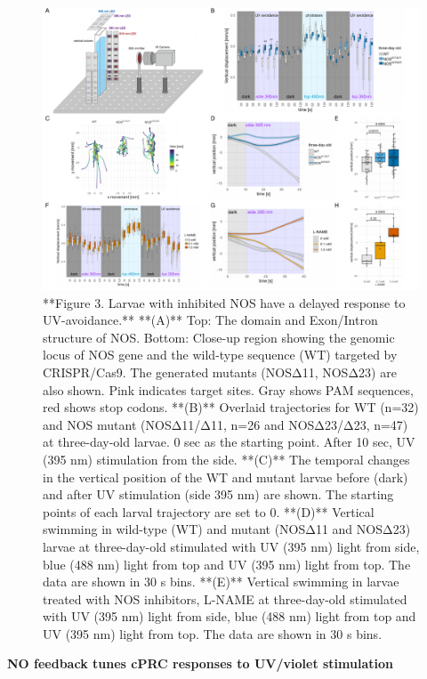 \documentclass[
  10pt,
  onecolumn]{article}
\begin{document}
\begin{figure}
\includegraphics[width=33.33in]{figures/Fig3} \caption{**Figure 3. Larvae with inhibited NOS have a delayed response to UV-avoidance.** **(A)** Top: The domain and Exon/Intron structure of NOS. Bottom: Close-up region showing the genomic locus of NOS gene and the wild-type sequence (WT) targeted by CRISPR/Cas9. The generated mutants (NOSΔ11, NOSΔ23) are also shown. Pink indicates target sites. Gray shows PAM sequences, red shows stop codons. **(B)** Overlaid trajectories for WT (n=32) and NOS mutant (NOSΔ11/Δ11, n=26 and NOSΔ23/Δ23, n=47) at three-day-old larvae. 0 sec as the starting point. After 10 sec, UV (395 nm) stimulation from the side. **(C)** The temporal changes in the vertical position of the WT and mutant larvae before (dark) and after UV stimulation (side 395 nm) are shown. The starting points of each larval trajectory are set to 0. **(D)** Vertical swimming in wild-type (WT) and mutant (NOSΔ11 and NOSΔ23) larvae at three-day-old stimulated with UV (395 nm) light from side, blue (488 nm) light from top and UV (395 nm) light from top. The data are shown in 30 s bins. **(E)** Vertical swimming in larvae treated with NOS inhibitors, L-NAME at three-day-old stimulated with UV (395 nm) light from side, blue (488 nm) light from top and UV (395 nm) light from top. The data are shown in 30 s bins.}\label{fig:unnamed-chunk-3}
\end{figure}

\textbf{NO feedback tunes cPRC responses to UV/violet stimulation}
\end{document}
